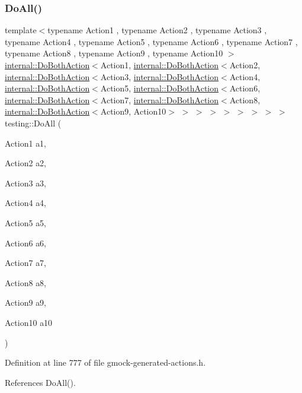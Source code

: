\subsubsection{\texorpdfstring{Do\+All()}{DoAll()}\hspace{0.1cm}{\footnotesize\ttfamily [9/9]}}
{\footnotesize\ttfamily template$<$typename Action1 , typename Action2 , typename Action3 , typename Action4 , typename Action5 , typename Action6 , typename Action7 , typename Action8 , typename Action9 , typename Action10 $>$ \\
\hyperlink{classtesting_1_1internal_1_1DoBothAction}{internal\+::\+Do\+Both\+Action}$<$Action1, \hyperlink{classtesting_1_1internal_1_1DoBothAction}{internal\+::\+Do\+Both\+Action}$<$Action2, \hyperlink{classtesting_1_1internal_1_1DoBothAction}{internal\+::\+Do\+Both\+Action}$<$Action3, \hyperlink{classtesting_1_1internal_1_1DoBothAction}{internal\+::\+Do\+Both\+Action}$<$Action4, \hyperlink{classtesting_1_1internal_1_1DoBothAction}{internal\+::\+Do\+Both\+Action}$<$Action5, \hyperlink{classtesting_1_1internal_1_1DoBothAction}{internal\+::\+Do\+Both\+Action}$<$Action6, \hyperlink{classtesting_1_1internal_1_1DoBothAction}{internal\+::\+Do\+Both\+Action}$<$Action7, \hyperlink{classtesting_1_1internal_1_1DoBothAction}{internal\+::\+Do\+Both\+Action}$<$Action8, \hyperlink{classtesting_1_1internal_1_1DoBothAction}{internal\+::\+Do\+Both\+Action}$<$Action9, Action10$>$ $>$ $>$ $>$ $>$ $>$ $>$ $>$ $>$ testing\+::\+Do\+All (\begin{DoxyParamCaption}\item[{Action1}]{a1,  }\item[{Action2}]{a2,  }\item[{Action3}]{a3,  }\item[{Action4}]{a4,  }\item[{Action5}]{a5,  }\item[{Action6}]{a6,  }\item[{Action7}]{a7,  }\item[{Action8}]{a8,  }\item[{Action9}]{a9,  }\item[{Action10}]{a10 }\end{DoxyParamCaption})\hspace{0.3cm}{\ttfamily [inline]}}



Definition at line 777 of file gmock-\/generated-\/actions.\+h.



References Do\+All().


